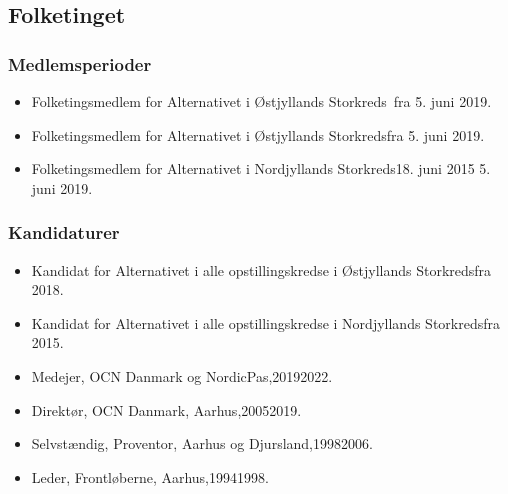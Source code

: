 \documentclass[11pt, a4paper]{awesome-cv}
\begin{document}
\begin{cvletter}
\subsection*{Folketinget}
\subsubsection*{Medlemsperioder}
\begin{itemize}
\item Folketingsmedlem for Alternativet i Østjyllands Storkreds fra 5. juni 2019.
\item Folketingsmedlem for Alternativet i Østjyllands Storkredsfra 5. juni 2019.
\item Folketingsmedlem for Alternativet i Nordjyllands Storkreds18. juni 2015  5. juni 2019.
\end{itemize}
\subsubsection*{Kandidaturer}
\begin{itemize}
\item Kandidat for Alternativet i alle opstillingskredse i Østjyllands Storkredsfra 2018.
\item Kandidat for Alternativet i alle opstillingskredse i Nordjyllands Storkredsfra 2015.
\end{itemize}
\begin{itemize}
\item Medejer, OCN Danmark og NordicPas,20192022.
\item Direktør, OCN Danmark, Aarhus,20052019.
\item Selvstændig, Proventor, Aarhus og Djursland,19982006.
\item Leder, Frontløberne, Aarhus,19941998.
\end{itemize}
\end{cvletter}
\end{document}

